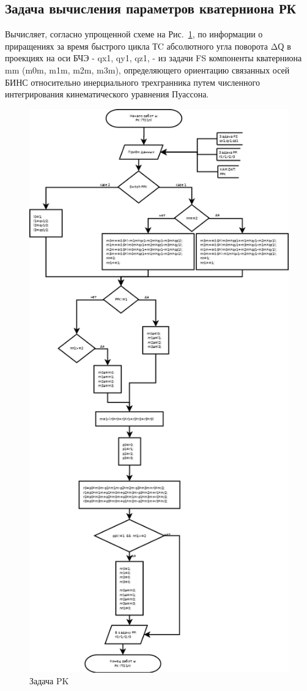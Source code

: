 \subsection{Задача вычисления параметров кватерниона РК}
Вычисляет, согласно упрощенной схеме на Рис.~\ref{fig:PK}, 
по  информации о приращениях за время быстрого цикла ТC  абсолютного угла поворота ΔԚ в проекциях на оси БЧЭ -  qx1, qy1, qz1, - из задачи  FS 
компоненты кватерниона mm (m0m, m1m, m2m, m3m), определяющего  ориентацию связанных осей БИНС относительно инерциального трехгранника путем численного 
интегрирования кинематического уравнения Пуассона.
\begin{figure}[H]
    \centering
    \includegraphics[width=0.8\linewidth]{images/PK.png}
    \caption{Задача PK}
    \label{fig:PK}
\end{figure}

